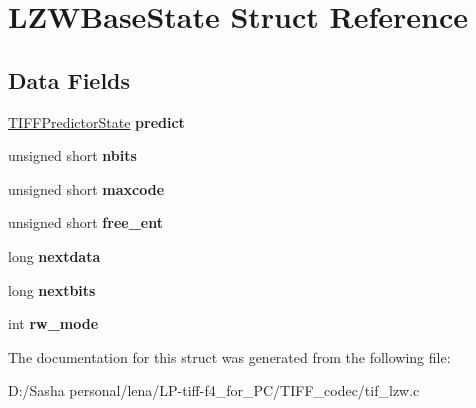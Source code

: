 \hypertarget{struct_l_z_w_base_state}{}\section{L\+Z\+W\+Base\+State Struct Reference}
\label{struct_l_z_w_base_state}
\subsection*{Data Fields}
\begin{DoxyCompactItemize}
\item 
\hypertarget{struct_l_z_w_base_state_a75c0cad87a8fdd68f1ecf6a2fc0b241f}{}\hyperlink{struct_t_i_f_f_predictor_state}{T\+I\+F\+F\+Predictor\+State} {\bfseries predict}\label{struct_l_z_w_base_state_a75c0cad87a8fdd68f1ecf6a2fc0b241f}

\item 
\hypertarget{struct_l_z_w_base_state_a697f5f6410d097aa6b8c5ef80717c79e}{}unsigned short {\bfseries nbits}\label{struct_l_z_w_base_state_a697f5f6410d097aa6b8c5ef80717c79e}

\item 
\hypertarget{struct_l_z_w_base_state_a3b237de8a9030f24956dc38fcb93a8b5}{}unsigned short {\bfseries maxcode}\label{struct_l_z_w_base_state_a3b237de8a9030f24956dc38fcb93a8b5}

\item 
\hypertarget{struct_l_z_w_base_state_a8713b1fb953c0e02d7ddcafd0f43afb6}{}unsigned short {\bfseries free\+\_\+ent}\label{struct_l_z_w_base_state_a8713b1fb953c0e02d7ddcafd0f43afb6}

\item 
\hypertarget{struct_l_z_w_base_state_abeed9eb12a4a919c05e31c77e0f48a00}{}long {\bfseries nextdata}\label{struct_l_z_w_base_state_abeed9eb12a4a919c05e31c77e0f48a00}

\item 
\hypertarget{struct_l_z_w_base_state_a1804c5766cb7d4833bad8fa22389edbf}{}long {\bfseries nextbits}\label{struct_l_z_w_base_state_a1804c5766cb7d4833bad8fa22389edbf}

\item 
\hypertarget{struct_l_z_w_base_state_a1dc8237f4aaebb684112dbc6e041ef32}{}int {\bfseries rw\+\_\+mode}\label{struct_l_z_w_base_state_a1dc8237f4aaebb684112dbc6e041ef32}

\end{DoxyCompactItemize}


The documentation for this struct was generated from the following file\+:\begin{DoxyCompactItemize}
\item 
D\+:/\+Sasha personal/lena/\+L\+P-\/tiff-\/f4\+\_\+for\+\_\+\+P\+C/\+T\+I\+F\+F\+\_\+codec/tif\+\_\+lzw.\+c\end{DoxyCompactItemize}
